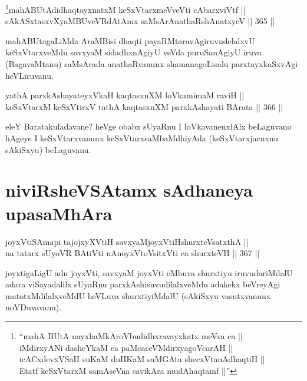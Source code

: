 \begin{shl}
\footnote{``mahA BUtA nayxhaMkAroVbudidhxravayxkatx meVva ca ||\\
iMdirxyANi dasheYkaM ca paMcaceVMdirxyagoVcarAH ||\\
icACxdevxVSaH suKaM duHKaM saMGAta shecxVtanAdhaqtiH ||\\
Etatf keSxVtarxM samAseVna savikAra mudAhaqtamf ||''}mahABUtAdidhaqtayxnatxM keSxVtarxmeVveVti cAbarxviVtf || \\
sAkASxtasxvXyaMBUveVRdAtAmx saMsArAnathaRshAnatxyeV \hfill || 365 ||  
\end{shl}

\begin{artha}
mahABUtagaLiMda AraMBisi dhaqti payaRMtaravAgiruvudelalxvU
keSxVtarxveMdu savxyaM sidadhxnAgiyU veVda puruSanAgiyU iruva
(BagavaMtanu) saMsArada anathaRvanunx shamanagoLisalu parxtayxkaSxvAgi
heVLiruvanu.
\end{artha}


\begin{shl}
yathA parxkAshayateyxVkaH kaqtasxnXM loVkamimaM raviH || \\
keSxVtarxM keSxVtirxV tathA kaqtasxnXM parxkAshayati BArata \hfill || 366 ||  
\end{shl}

\begin{artha}
eleY Baratakuladavane? heVge obabx sUyaRnu I loVkavanenxlAlx
beLaguvano hAgeye I keSxVtarxvanunx keSxVtarxsaMbaMdhiyAda
(keSxVtarxjacnxnu sAkiSxyu) beLaguvanu.
\end{artha}

\section*{niviRsheVSAtamx sAdhaneya upasaMhAra}


\begin{shl}
joyxVtiSAmapi tajojxyXVtiH savxyaMjoyxVtiHshurxteVsatxthA || \\
na tatarx sUyoVR BAtiVti nAnoyxV\s toV\s sitxVti ca shurxteVH \hfill || 367 ||  
\end{shl}

\begin{artha}
joyxtigaLigU adu joyxVti, savxyaM joyxVti eMbuva shurxtiyu
iruvudariMdalU adara viSayadalilx sUyaRnu parxkAshisuvudilalxveMdu
adakekx beVreyAgi matotxMdilalxveMdU heVLuva shurxtiyiMdalU (sAkiSxyu
vasutxvanunx noVDuvavanu).
\end{artha}

